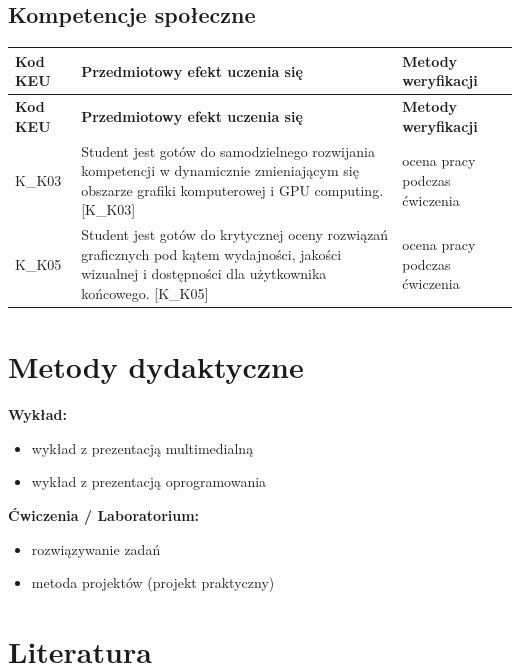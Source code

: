 \documentclass[12pt, a4paper]{article}
\newcommand{\thdrule}{\noalign{\global\setlength{\extrarowheight}{0pt}}}
\newcommand{\thdend}{\noalign{\global\setlength{\extrarowheight}{3pt}}}
\begin{document}
\subsection*{Kompetencje społeczne}
{\scriptsize
\begin{longtable}{m{1.6cm}m{9.0cm}m{4.2cm}}
\thdrule\toprule
\rowcolor{pjatkRed} {\color{white}\footnotesize\textbf{\vphantom{Ag}Kod KEU}} & {\color{white}\footnotesize\textbf{\vphantom{Ag}Przedmiotowy efekt uczenia się}} & {\color{white}\footnotesize\textbf{\vphantom{Ag}Metody weryfikacji}} \\
\midrule\thdend
\endfirsthead
\thdrule\toprule
\rowcolor{pjatkRed} {\color{white}\footnotesize\textbf{\vphantom{Ag}Kod KEU}} & {\color{white}\footnotesize\textbf{\vphantom{Ag}Przedmiotowy efekt uczenia się}} & {\color{white}\footnotesize\textbf{\vphantom{Ag}Metody weryfikacji}} \\
\midrule\thdend
\endhead
  \rowcolor{tableRowLight} K\_K03 & Student jest gotów do samodzielnego rozwijania kompetencji w dynamicznie zmieniającym się obszarze grafiki komputerowej i GPU computing. {[}K\_K03{]} & ocena pracy podczas ćwiczenia \\
  \rowcolor{tableRowAlt} K\_K05 & Student jest gotów do krytycznej oceny rozwiązań graficznych pod kątem wydajności, jakości wizualnej i dostępności dla użytkownika końcowego. {[}K\_K05{]} & ocena pracy podczas ćwiczenia \\
\bottomrule
\end{longtable}}

\section{Metody dydaktyczne}

\textbf{Wykład:}
\begin{itemize}
  \item wykład z prezentacją multimedialną
  \item wykład z prezentacją oprogramowania
\end{itemize}
\vspace{4pt}
\textbf{Ćwiczenia / Laboratorium:}
\begin{itemize}
  \item rozwiązywanie zadań
  \item metoda projektów (projekt praktyczny)
\end{itemize}
\vspace{4pt}


\section{Literatura}
\end{document}
